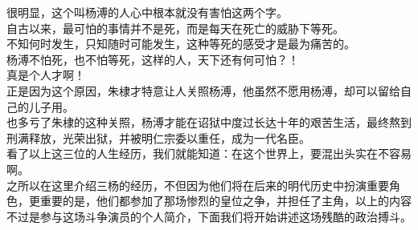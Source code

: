 \begin{multicols}{\theparacolNo}
很明显，这个叫杨溥的人心中根本就没有害怕这两个字。\\

自古以来，最可怕的事情并不是死，而是每天在死亡的威胁下等死。\\

不知何时发生，只知随时可能发生，这种等死的感受才是最为痛苦的。\\

杨溥不怕死，也不怕等死，这样的人，天下还有何可怕？！\\

真是个人才啊！\\

正是因为这个原因，朱棣才特意让人关照杨溥，他虽然不愿用杨溥，却可以留给自己的儿子用。\\

也多亏了朱棣的这种关照，杨溥才能在诏狱中度过长达十年的艰苦生活，最终熬到刑满释放，光荣出狱，并被明仁宗委以重任，成为一代名臣。\\

看了以上这三位的人生经历，我们就能知道：在这个世界上，要混出头实在不容易啊。\\

之所以在这里介绍三杨的经历，不但因为他们将在后来的明代历史中扮演重要角色，更重要的是，他们都参加了那场惨烈的皇位之争，并担任了主角，以上的内容不过是参与这场斗争演员的个人简介，下面我们将开始讲述这场残酷的政治搏斗。\\
\ifnum{}
	\end{multicols}
\fi
\newpage
